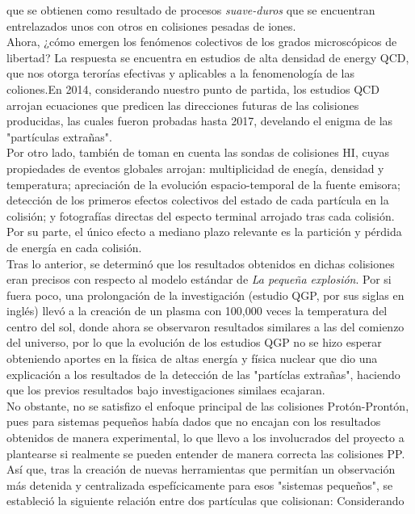 \documentclass[letterpaper, 11pt]{article}
\begin{document}
\begin{multicols}{2}
que se obtienen como resultado de procesos \textit{suave-duros} que se encuentran entrelazados unos con otros en colisiones pesadas de iones. \\
Ahora, ¿cómo emergen los fenómenos colectivos de los grados microscópicos de libertad? La respuesta se encuentra en estudios de alta densidad de energy QCD, que nos otorga terorías efectivas y aplicables a la fenomenología de las coliones.En 2014, considerando nuestro punto de partida, los estudios QCD arrojan ecuaciones que predicen las direcciones futuras de las colisiones producidas, las cuales fueron probadas hasta 2017, develando el enigma de las "partículas extrañas". \\
Por otro lado, también de toman en cuenta las sondas de colisiones HI, cuyas propiedades de eventos globales arrojan: multiplicidad de enegía, densidad y temperatura; apreciación de la evolución espacio-temporal de la fuente emisora; detección de los primeros efectos colectivos del estado de cada partícula en la colisión; y fotografías directas del especto terminal arrojado tras cada colisión. Por su parte, el único efecto a mediano plazo relevante es la partición y pérdida de energía en cada colisión. \\
Tras lo anterior, se determinó que los resultados obtenidos en dichas colisiones eran precisos con respecto al modelo estándar de \textit{La pequeña explosión}. Por si fuera poco, una prolongación de la investigación (estudio QGP, por sus siglas en inglés) llevó a la creación de un plasma con 100,000 veces la temperatura del centro del sol, donde ahora se observaron resultados similares a las del comienzo del universo, por lo que la evolución de los estudios QGP no se hizo esperar obteniendo aportes en la física de altas energía y física nuclear que dio una explicación a los resultados de la detección de las "partíclas extrañas", haciendo que los previos resultados bajo investigaciones similaes ecajaran.\\
No obstante, no se satisfizo el enfoque principal de las colisiones Protón-Prontón, pues para sistemas pequeños había dados que no encajan con los resultados obtenidos de manera experimental, lo que llevo a los involucrados del proyecto a plantearse si realmente se pueden entender de manera correcta las colisiones PP.
Así que, tras la creación de nuevas herramientas que permitían un observación más detenida y centralizada espefícicamente para esos "sistemas pequeños", se estableció la siguiente relación entre dos partículas que colisionan:
Considerando\\

\end{multicols}
\end{document}
